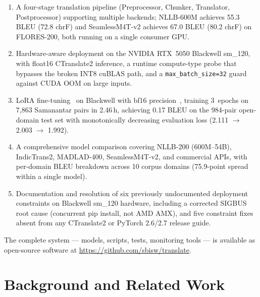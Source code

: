 \documentclass[conference]{IEEEtran}
\newcommand{\POSTFTBLEU}{0.17}
\newcommand{\TRAINDURATION}{2.46\,h}
\newcommand{\NLLBFLORESBLEU}{55.3}
\newcommand{\NLLBFLORESCHRF}{72.8}
\newcommand{\SEAMLESSPROJBLEU}{67.0}
\newcommand{\SEAMLESSPROJCHRF}{80.2}
\begin{document}
\begin{enumerate}
  \item A four-stage translation pipeline (Preprocessor, Chunker, Translator,
        Postprocessor) supporting multiple backends; NLLB-600M achieves \NLLBFLORESBLEU{}
        BLEU (\NLLBFLORESCHRF{} chrF) and SeamlessM4T-v2 achieves \SEAMLESSPROJBLEU{}
        BLEU (\SEAMLESSPROJCHRF{} chrF) on FLORES-200, both running on a single consumer GPU.

  \item Hardware-aware deployment on the NVIDIA RTX~5050 Blackwell sm\_120, with
        float16 CTranslate2 inference, a runtime compute-type probe that bypasses
        the broken INT8 cuBLAS path, and a \texttt{max\_batch\_size=32} guard against
        CUDA OOM on large inputs.

  \item LoRA fine-tuning~\cite{hu2021lora} on Blackwell with bf16 precision~\cite{micikevicius2018mixed},
        training 3~epochs on 7,863 Samanantar pairs in \TRAINDURATION, achieving
        \POSTFTBLEU{} BLEU on the 984-pair open-domain test set with monotonically
        decreasing evaluation loss (2.111 $\to$ 2.003 $\to$ 1.992).

  \item A comprehensive model comparison covering NLLB-200 (600M--54B), IndicTrans2,
        MADLAD-400, SeamlessM4T-v2, and commercial APIs, with per-domain BLEU
        breakdown across 10 corpus domains (75.9-point spread within a single model).

  \item Documentation and resolution of six previously undocumented deployment
        constraints on Blackwell sm\_120 hardware, including a corrected SIGBUS
        root cause (concurrent pip install, not AMD AMX), and five constraint fixes
        absent from any CTranslate2 or PyTorch 2.6/2.7 release guide.
\end{enumerate}

The complete system --- models, scripts, tests, monitoring tools --- is available
as open-source software at \url{https://github.com/sbisw/translate}.

\section{Background and Related Work}
\end{document}
